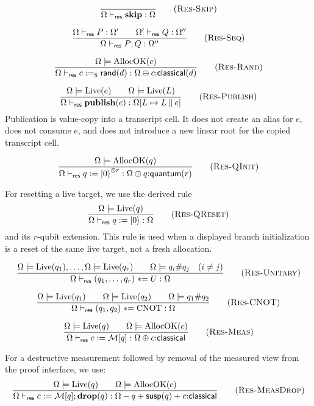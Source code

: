 \documentclass{report}
\theoremstyle{defn_style}
\newcommand{\asteq}{\mathrel{*}=}
\providecommand{\Live}{\operatorname{Live}}
\providecommand{\AllocOK}{\operatorname{AllocOK}}
\providecommand{\susp}{\mathsf{susp}}
\begin{document}
\[
\frac{}{\Omega\vdash_{\mathsf{res}}\mathbf{skip}:\Omega}
\tag{\textsc{Res-Skip}}
\]

\[
\frac{
  \Omega\vdash_{\mathsf{res}}P:\Omega'
  \qquad
  \Omega'\vdash_{\mathsf{res}}Q:\Omega''
}{
  \Omega\vdash_{\mathsf{res}}P;Q:\Omega''
}
\tag{\textsc{Res-Seq}}
\]

\[
\frac{
  \Omega\models\AllocOK(c)
}{
  \Omega\vdash_{\mathsf{res}}
  c:=_\$\mathsf{rand}(d)
  :
  \Omega\oplus c{:}\mathsf{classical}(d)
}
\tag{\textsc{Res-Rand}}
\]

\[
\frac{
  \Omega\models\Live(e)
  \qquad
  \Omega\models\Live(L)
}{
  \Omega\vdash_{\mathsf{res}}
  \mathbf{publish}(e)
  :
  \Omega[L\mapsto L\mathbin{\|}e]
}
\tag{\textsc{Res-Publish}}
\]
Publication is value-copy into a transcript cell.  It does not create an alias
for \(e\), does not consume \(e\), and does not introduce a new linear root for
the copied transcript cell.

\[
\frac{
  \Omega\models\AllocOK(q)
}{
  \Omega\vdash_{\mathsf{res}}
  q:=\ket 0^{\otimes r}
  :
  \Omega\oplus q{:}\mathsf{quantum}(r)
}
\tag{\textsc{Res-QInit}}
\]

For resetting a live target, we use the derived rule
\[
\frac{
  \Omega\models\Live(q)
}{
  \Omega\vdash_{\mathsf{res}}
  q:=\ket0
  :
  \Omega
}
\tag{\textsc{Res-QReset}}
\]
and its \(r\)-qubit extension.  This rule is used when a displayed branch
initialization is a reset of the same live target, not a fresh allocation.

\[
\frac{
  \Omega\models\Live(q_1),\ldots,\Omega\models\Live(q_r)
  \qquad
  \Omega\models q_i\#q_j\quad(i\neq j)
}{
  \Omega\vdash_{\mathsf{res}}
  (q_1,\ldots,q_r)\asteq U
  :
  \Omega
}
\tag{\textsc{Res-Unitary}}
\]

\[
\frac{
  \Omega\models\Live(q_1)
  \qquad
  \Omega\models\Live(q_2)
  \qquad
  \Omega\models q_1\#q_2
}{
  \Omega\vdash_{\mathsf{res}}
  (q_1,q_2)\asteq\mathrm{CNOT}
  :
  \Omega
}
\tag{\textsc{Res-CNOT}}
\]

\[
\frac{
  \Omega\models\Live(q)
  \qquad
  \Omega\models\AllocOK(c)
}{
  \Omega\vdash_{\mathsf{res}}
  c:=\mathcal M[q]
  :
  \Omega\oplus c{:}\mathsf{classical}
}
\tag{\textsc{Res-Meas}}
\]

For a destructive measurement followed by removal of the measured view from the
proof interface, we use:
\[
\frac{
  \Omega\models\Live(q)
  \qquad
  \Omega\models\AllocOK(c)
}{
  \Omega\vdash_{\mathsf{res}}
  c:=\mathcal M[q];\mathbf{drop}(q)
  :
  \Omega-q+\susp(q)+c{:}\mathsf{classical}
}
\tag{\textsc{Res-MeasDrop}}
\]
\end{document}

